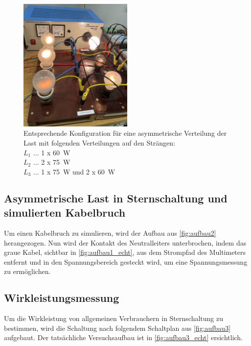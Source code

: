 \documentclass[12pt,english,ngerman]{scrartcl}
\begin{document}
\begin{figure}[H]
	\begin{center}
		\includegraphics[width = 0.5\textwidth]{./figures/lampen.png}
	\end{center}
	\caption[Entsprechende Konfiguration für eine asymmetrische Verteilung der Last]
	{Entsprechende Konfiguration für eine asymmetrische Verteilung der Last mit folgenden Verteilungen auf den Strängen: \\
	$L_1$ \(\dots\) 1 x \SI[]{60}{\watt} \\
	$L_2$ \(\dots\) 2 x \SI[]{75}{\watt} \\
	$L_3$ \(\dots\) 1 x \SI[]{75}{\watt} und 2 x \SI[]{60}{\watt}
	}\label{fig:lampenasym}
\end{figure}

\subsection{Asymmetrische Last in Sternschaltung und simulierten Kabelbruch}


Um einen Kabelbruch zu simulieren, wird der Aufbau aus \autoref{fig:aufbau2} herangezogen. Nun wird der Kontakt 
des Neutralleiters unterbrochen, indem das graue Kabel, sichtbar in \autoref{fig:aufbau1_echt}, aus dem 
Strompfad des Multimeters entfernt und in den Spannungsbereich gesteckt wird, um eine Spannungsmessung zu ermöglichen.



\subsection{Wirkleistungsmessung}

Um die Wirkleistung von allgemeinen Verbrauchern in Sternschaltung zu bestimmen, wird die Schaltung
nach folgendem Schaltplan aus \autoref{fig:aufbau3} aufgebaut. 
Der tatsächliche Versuchsaufbau ist in \autoref{fig:aufbau3_echt} ersichtlich.
\end{document}
